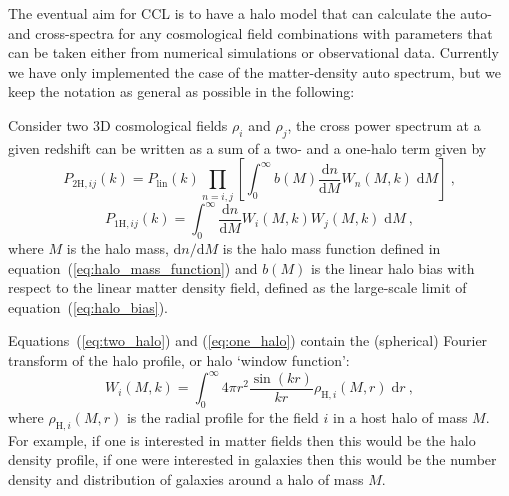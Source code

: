 \documentclass[\docopts]{\docclass}
\begin{document}
The eventual aim for CCL is to have a halo model that can calculate the auto- and cross-spectra for any cosmological field combinations with parameters that can be taken either from numerical simulations or observational data. Currently we have only implemented the case of the matter-density auto spectrum, but we keep the notation as general as possible in the following:

Consider two 3D cosmological fields $\rho_i$ and $\rho_j$, the cross power spectrum at a given redshift can be written as a sum of a two- and a one-halo term given by
\begin{equation}
P_{2\mathrm{H},ij}(k)=P_{\mathrm{lin}}(k)
\prod_{n=i,j}\left[\int_0^\infty b(M)\frac{\mathrm{d}n}{\mathrm{d}M}W_n(M,k)\;\mathrm{d}M\right]\ ,
\label{eq:two_halo}
\end{equation}
\begin{equation}
P_{1\mathrm{H},ij}(k)=\int_0^\infty \frac{\mathrm{d}n}{\mathrm{d}M}W_i(M,k)W_j(M,k)\;\mathrm{d}M\ ,
\label{eq:one_halo}
\end{equation}
where $M$ is the halo mass, $\mathrm{d}n/\mathrm{d}M$ is the halo mass function defined in equation~(\ref{eq:halo_mass_function}) and $b(M)$ is the linear halo bias with respect to the linear matter density field, defined as the large-scale limit of equation~(\ref{eq:halo_bias}).

Equations~(\ref{eq:two_halo}) and (\ref{eq:one_halo}) contain the (spherical) Fourier transform of the halo profile, or halo `window function':
\begin{equation}
W_i(M,k)=\int_0^\infty4\pi r^2\frac{\sin(kr)}{kr}\rho_{\mathrm{H},i}(M,r)\;\mathrm{d}r\ ,
\label{eq:window_function}
\end{equation}
where $\rho_{\mathrm{H},i}(M,r)$ is the radial profile for the field $i$ in a host halo of mass $M$. For example, if one is interested in matter fields then this would be the halo density profile, if one were interested in galaxies then this would be the number density and distribution of galaxies around a halo of mass $M$.
\end{document}
